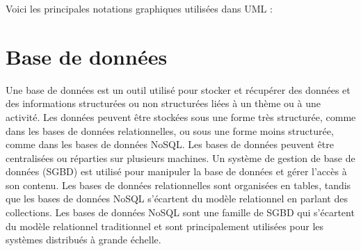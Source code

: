 Voici les principales notations graphiques utilisées dans UML :

\section{Base de données}
Une base de données est un outil utilisé pour stocker et récupérer des
données et des informations structurées ou non structurées liées à un thème
ou à une activité\cite{GarciaMolina2019}. Les données peuvent être stockées sous une forme très structurée,
comme dans les bases de données relationnelles, ou sous une forme moins structurée,
comme dans les bases de données NoSQL. Les bases de données peuvent être centralisées
ou réparties sur plusieurs machines. Un système de gestion de base de données (SGBD)
est utilisé pour manipuler la base de données et gérer l'accès à son contenu.
Les bases de données relationnelles sont organisées en tables, tandis que les
bases de données NoSQL s'écartent du modèle relationnel en parlant des collections. Les bases de données NoSQL
sont une famille de SGBD qui s'écartent du modèle relationnel traditionnel et sont
principalement utilisées pour les systèmes distribués à grande échelle.